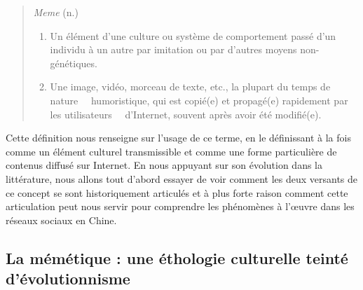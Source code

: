 \begin{quote}
    \textit{Meme }(n.)

    \begin{enumerate}
        \item Un \'el\'ement d{\textquoteright}une culture ou syst\`eme de comportement pass\'e d{\textquoteright}un individu \`a un autre par imitation ou par d{\textquoteright}autres moyens non-g\'en\'etiques.
        \item Une image, vid\'eo, morceau de texte, etc., la plupart du temps de nature \ \ humoristique, qui est copi\'e(e) et propag\'e(e) rapidement par les utilisateurs \ \ d{\textquoteright}Internet, souvent apr\`es avoir \'et\'e modifi\'e(e).
    \end{enumerate}

\end{quote}

 Cette d\'efinition nous renseigne sur l{\textquoteright}usage de ce terme, en le d\'efinissant \`a la fois comme un \'el\'ement culturel transmissible et comme une forme particuli\`ere de contenus diffus\'e sur Internet. En nous appuyant sur son \'evolution dans la litt\'erature, nous allons tout d{\textquoteright}abord essayer de voir comment les deux versants de ce concept se sont historiquement articul\'es et \`a plus forte raison comment cette articulation peut nous servir pour comprendre les ph\'enom\`enes \`a l{\textquoteright}{\oe}uvre dans les r\'eseaux sociaux en Chine. 

\subsection[La m\'em\'etique : une \'ethologie culturelle teint\'e d{\textquoteright}\'evolutionnisme]{La m\'em\'etique : une \'ethologie culturelle teint\'e d{\textquoteright}\'evolutionnisme}

